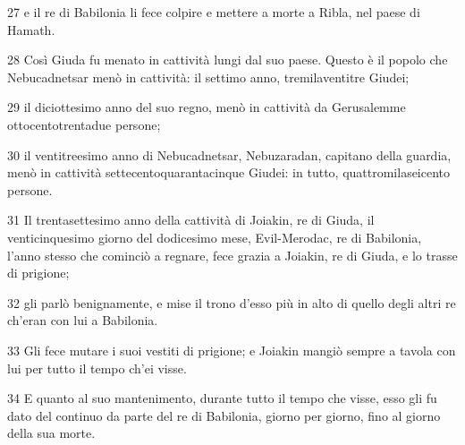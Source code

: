 \par 27 e il re di Babilonia li fece colpire e mettere a morte a Ribla, nel paese di Hamath.
\par 28 Così Giuda fu menato in cattività lungi dal suo paese. Questo è il popolo che Nebucadnetsar menò in cattività: il settimo anno, tremilaventitre Giudei;
\par 29 il diciottesimo anno del suo regno, menò in cattività da Gerusalemme ottocentotrentadue persone;
\par 30 il ventitreesimo anno di Nebucadnetsar, Nebuzaradan, capitano della guardia, menò in cattività settecentoquarantacinque Giudei: in tutto, quattromilaseicento persone.
\par 31 Il trentasettesimo anno della cattività di Joiakin, re di Giuda, il venticinquesimo giorno del dodicesimo mese, Evil-Merodac, re di Babilonia, l'anno stesso che cominciò a regnare, fece grazia a Joiakin, re di Giuda, e lo trasse di prigione;
\par 32 gli parlò benignamente, e mise il trono d'esso più in alto di quello degli altri re ch'eran con lui a Babilonia.
\par 33 Gli fece mutare i suoi vestiti di prigione; e Joiakin mangiò sempre a tavola con lui per tutto il tempo ch'ei visse.
\par 34 E quanto al suo mantenimento, durante tutto il tempo che visse, esso gli fu dato del continuo da parte del re di Babilonia, giorno per giorno, fino al giorno della sua morte.


